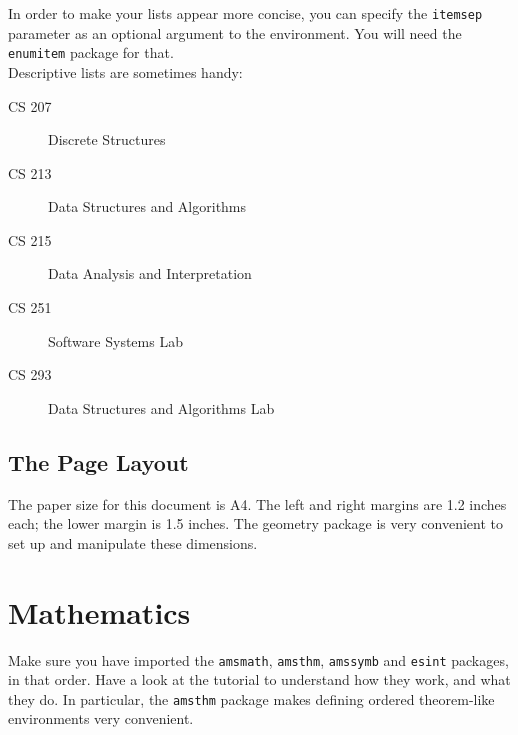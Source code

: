\documentclass[10pt, A4]{article}
\begin{document}
\vspace{-.4em}
In order to make your lists appear more concise, you can specify the \texttt{itemsep} parameter as an
optional argument to the environment. You will need the \texttt{enumitem} package for that.\vspace{0.5em}\\
Descriptive lists are sometimes handy:
\vspace{-0.5em}
\begin{description}
	\item [CS 207] Discrete Structures
	\vspace{-0.8em}
	\item [CS 213] Data Structures and Algorithms
	\vspace{-0.8em}
	\item [CS 215] Data Analysis and Interpretation
	\vspace{-0.8em}
	\item [CS 251] Software Systems Lab
	\vspace{-0.8em}
	\item [CS 293] Data Structures and Algorithms Lab
	\vspace{-0.5em}
\end{description}
\subsection*{The Page Layout}
\vspace{-.5em}
The paper size for this document is A4. The left and right margins are 1.2 inches each; the lower
margin is 1.5 inches. The geometry package is very convenient to set up and manipulate these
dimensions.
\vspace{1.5em}


\section{Mathematics}
\label{math}

Make sure you have imported the \texttt{amsmath}, \texttt{amsthm}, \texttt{amssymb} and \texttt{esint} packages, in that order.
Have a look at the tutorial to understand how they work, and what they do. In particular, the
\texttt{amsthm} package makes defining ordered theorem-like environments very convenient.\vspace{0.5em}\\
\end{document}
